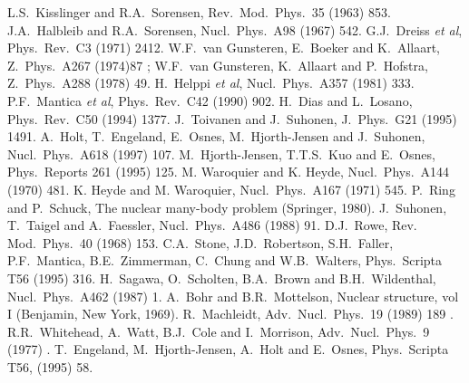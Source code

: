\begin{thebibliography}{99}
L.S.\ Kisslinger and R.A.\ Sorensen, Rev.\ Mod.\ Phys.\ 35 (1963) 853.
J.A.\ Halbleib and R.A.\ Sorensen, Nucl.\ Phys.\ A98 (1967) 542.
G.J.\ Dreiss {\em et al}, Phys.\ Rev.\ C3 (1971) 2412.
W.F.\ van Gunsteren, E.\ Boeker and K.\ Allaart, Z.\ Phys.\ A267 (1974)87 ; 
W.F.\ van Gunsteren, K.\ Allaart and P.\ Hofstra, Z.\ Phys.\ A288 (1978) 49.
H.\ Helppi {\em et al}, Nucl.\ Phys.\ A357 (1981) 333.
P.F.\ Mantica {\em et al}, Phys.\ Rev.\ C42 (1990) 902.
H.\ Dias and L.\ Losano, Phys.\ Rev.\ C50 (1994) 1377.
J.\ Toivanen and J.\ Suhonen, J.\ Phys.\ G21 (1995) 1491.
A.\ Holt, T.\ Engeland, E.\ Osnes, M.\ Hjorth-Jensen and J.\ Suhonen, 
Nucl.\ Phys.\ A618 (1997) 107.
M.\ Hjorth-Jensen, T.T.S.\ Kuo and E.\ Osnes, Phys.\ Reports 261 (1995) 125.
M. Waroquier and K. Heyde, Nucl.\ Phys.\ A144 (1970) 481.
K. Heyde and M. Waroquier, Nucl.\ Phys.\ A167 (1971) 545.
P.\ Ring and P.\ Schuck, The nuclear many-body problem (Springer, 1980).
J.\ Suhonen, T.\ Taigel and A.\ Faessler, Nucl.\ Phys.\ A486 (1988) 91.
D.J.\ Rowe, Rev. Mod.\ Phys.\ 40 (1968) 153.
C.A.\ Stone, J.D.\ Robertson, S.H.\ Faller, P.F.\ Mantica,
B.E.\ Zimmerman, C.\ Chung and W.B.\ Walters, Phys.\ Scripta T56 (1995) 316.
H.\ Sagawa, O.\ Scholten, B.A.\ Brown and B.H.\ Wildenthal,
Nucl.\ Phys.\ A462 (1987) 1.
A.\ Bohr and B.R.\ Mottelson, Nuclear structure, vol I 
(Benjamin, New York, 1969).
R.\ Machleidt, Adv.\ Nucl.\ Phys.\ 19 (1989) 189 .
R.R.\ Whitehead, A.\ Watt, B.J.\ Cole and I.\ Morrison, 
Adv.\ Nucl.\ Phys.\ 9 (1977) .
T.\ Engeland, M.\ Hjorth-Jensen, A.\ Holt and E.\ Osnes,
Phys.\ Scripta T56, (1995) 58.
\end{thebibliography}












